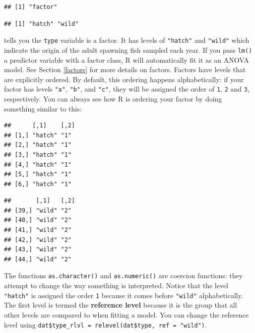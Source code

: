 \documentclass[]{book}
\newenvironment{Shaded}{\begin{snugshade}}{\end{snugshade}}
\newcommand{\KeywordTok}[1]{\textcolor[rgb]{0.13,0.29,0.53}{\textbf{#1}}}
\newcommand{\StringTok}[1]{\textcolor[rgb]{0.31,0.60,0.02}{#1}}
\newcommand{\OperatorTok}[1]{\textcolor[rgb]{0.81,0.36,0.00}{\textbf{#1}}}
\newcommand{\NormalTok}[1]{#1}
\theoremstyle{definition}
\theoremstyle{definition}
\theoremstyle{definition}
\theoremstyle{remark}
\begin{document}
\begin{verbatim}
## [1] "factor"
\end{verbatim}

\begin{verbatim}
## [1] "hatch" "wild"
\end{verbatim}

tells you the \texttt{type} variable is a factor. It has levels of
\texttt{"hatch"} and \texttt{"wild"} which indicate the origin of the
adult spawning fish sampled each year. If you pass \texttt{lm()} a
predictor variable with a factor class, R will automatically fit it as
an ANOVA model. See Section \ref{factors} for more details on factors.
Factors have levels that are explicitly ordered. By default, this
ordering happens alphabetically: if your factor has levels \texttt{"a"},
\texttt{"b"}, and \texttt{"c"}, they will be assigned the order of
\texttt{1}, \texttt{2} and \texttt{3}, respectively. You can always see
how R is ordering your factor by doing something similar to this:

\begin{Shaded}
\end{Shaded}

\begin{verbatim}
##      [,1]    [,2]
## [1,] "hatch" "1" 
## [2,] "hatch" "1" 
## [3,] "hatch" "1" 
## [4,] "hatch" "1" 
## [5,] "hatch" "1" 
## [6,] "hatch" "1"
\end{verbatim}

\begin{verbatim}
##       [,1]   [,2]
## [39,] "wild" "2" 
## [40,] "wild" "2" 
## [41,] "wild" "2" 
## [42,] "wild" "2" 
## [43,] "wild" "2" 
## [44,] "wild" "2"
\end{verbatim}

The functions \texttt{as.character()} and \texttt{as.numeric()} are
coercion functions: they attempt to change the way something is
interpreted. Notice that the level \texttt{"hatch"} is assigned the
order \texttt{1} because it comes before \texttt{"wild"} alphabetically.
The first level is termed the \textbf{reference level} because it is the
group that all other levels are compared to when fitting a model. You
can change the reference level using
\texttt{dat\$type\_rlvl\ =\ relevel(dat\$type,\ ref\ =\ "wild")}.
\end{document}

